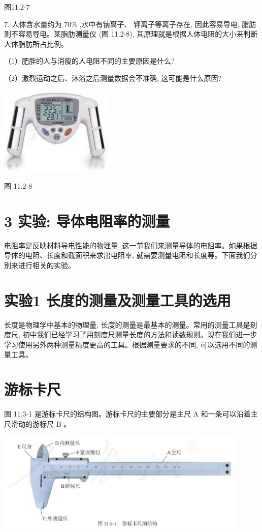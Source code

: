\documentclass[10pt]{article}
\begin{document}
图11.2-7

7. 人体含水量约为 \({70}\%\) ,水中有钠离子、 钾离子等离子存在, 因此容易导电, 脂肪则不容易导电。某脂肪测量仪 (图 11.2-8), 其原理就是根据人体电阻的大小来判断人体脂肪所占比例。

（1）肥胖的人与消瘦的人电阻不同的主要原因是什么?

（2）激烈运动之后、沐浴之后测量数据会不准确, 这可能是什么原因?

\begin{center}
\includegraphics[max width=0.4\textwidth]{images/01911d5f-8e38-70c0-b5b8-2b399bd115b6_66_178411.jpg}
\end{center}

图 11.2-8

\section*{3 实验: 导体电阻率的测量}

电阻率是反映材料导电性能的物理量, 这一节我们来测量导体的电阻率。如果根据导体的电阻、长度和截面积来求出电阻率, 就需要测量电阻和长度等。下面我们分别来进行相关的实验。

\section*{实验1 长度的测量及测量工具的选用}

长度是物理学中基本的物理量, 长度的测量是最基本的测量。常用的测量工具是刻度尺, 初中我们已经学习了用刻度尺测量长度的方法和读数规则。现在我们进一步学习使用另外两种测量精度更高的工具。根据测量要求的不同, 可以选用不同的测量工具。

\section*{游标卡尺}

图 11.3-1 是游标卡尺的结构图。游标卡尺的主要部分是主尺 \(\mathrm{A}\) 和一条可以沿着主尺滑动的游标尺 \(\mathrm{B}\) 。

\begin{center}
\includegraphics[max width=0.9\textwidth]{images/01911d5f-8e38-70c0-b5b8-2b399bd115b6_67_274586.jpg}
\end{center}
\end{document}
